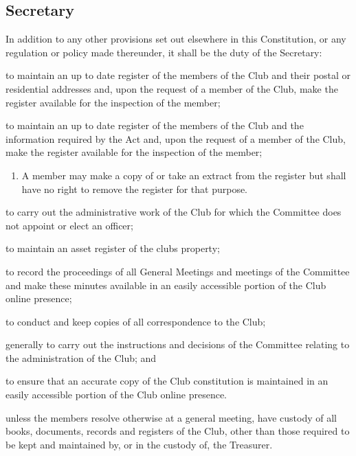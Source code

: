 \documentclass[11pt]{article} %
\begin{document}
\subsection{Secretary}
In addition to any other provisions set out elsewhere in this Constitution, or any regulation or policy made thereunder, it shall be the duty of the Secretary:
\begin{enumerate}

	{\color{red} \item to maintain an up to date register of the members of the Club and their postal or residential addresses and, upon the request of a member of the Club, make the register available for the inspection of the member;}
	{\color{ForestGreen} \item to maintain an up to date register of the members of the Club and the information required by the Act and, upon the request of a member of the Club, make the register available for the inspection of the member;}
	\begin{enumerate}[1.]
			\item A member may make a copy of or take an extract from the register but shall have no right to remove the register for that purpose.
		\end{enumerate}
	\item to carry out the administrative work of the Club for which the Committee does not appoint or elect an officer;
	{\color{ForestGreen}\item to maintain an asset register of the clubs property;}
	\item to record the proceedings of all General Meetings and meetings of the Committee and make these minutes available in an easily accessible portion of the Club online presence;
	\item to conduct and keep copies of all correspondence to the Club;
	\item generally to carry out the instructions and decisions of the Committee relating to the administration of the Club; and
	\item to ensure that an accurate copy of the Club constitution is maintained in an easily accessible portion of the Club online presence.
	\item unless the members resolve otherwise at a general meeting, have custody of all books, documents, records and registers of the Club, other than those required to be kept and maintained by, or in the custody of, the Treasurer.
\end{enumerate}
\end{document}
